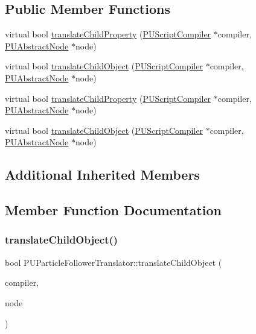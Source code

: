 \subsection*{Public Member Functions}
\begin{DoxyCompactItemize}
\item 
virtual bool \hyperlink{classPUParticleFollowerTranslator_a3e490698cdbd4523b9da61af9253337a}{translate\+Child\+Property} (\hyperlink{classPUScriptCompiler}{P\+U\+Script\+Compiler} $\ast$compiler, \hyperlink{classPUAbstractNode}{P\+U\+Abstract\+Node} $\ast$node)
\item 
virtual bool \hyperlink{classPUParticleFollowerTranslator_aff039ec1698093f1c60cc32e128063fd}{translate\+Child\+Object} (\hyperlink{classPUScriptCompiler}{P\+U\+Script\+Compiler} $\ast$compiler, \hyperlink{classPUAbstractNode}{P\+U\+Abstract\+Node} $\ast$node)
\item 
virtual bool \hyperlink{classPUParticleFollowerTranslator_a1fe452f94c21682af876747b805dfd47}{translate\+Child\+Property} (\hyperlink{classPUScriptCompiler}{P\+U\+Script\+Compiler} $\ast$compiler, \hyperlink{classPUAbstractNode}{P\+U\+Abstract\+Node} $\ast$node)
\item 
virtual bool \hyperlink{classPUParticleFollowerTranslator_a962f3cdf389ba6b23e10204a6efd04a8}{translate\+Child\+Object} (\hyperlink{classPUScriptCompiler}{P\+U\+Script\+Compiler} $\ast$compiler, \hyperlink{classPUAbstractNode}{P\+U\+Abstract\+Node} $\ast$node)
\end{DoxyCompactItemize}
\subsection*{Additional Inherited Members}


\subsection{Member Function Documentation}
\mbox{\label{classPUParticleFollowerTranslator_aff039ec1698093f1c60cc32e128063fd}} 
\subsubsection{\texorpdfstring{translate\+Child\+Object()}{translateChildObject()}\hspace{0.1cm}{\footnotesize\ttfamily [1/2]}}
{\footnotesize\ttfamily bool P\+U\+Particle\+Follower\+Translator\+::translate\+Child\+Object (\begin{DoxyParamCaption}\item[{\hyperlink{classPUScriptCompiler}{P\+U\+Script\+Compiler} $\ast$}]{compiler,  }\item[{\hyperlink{classPUAbstractNode}{P\+U\+Abstract\+Node} $\ast$}]{node }\end{DoxyParamCaption})\hspace{0.3cm}{\ttfamily [virtual]}}

